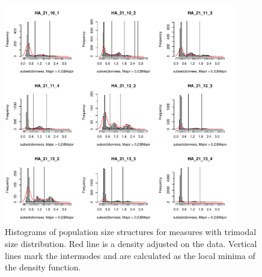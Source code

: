 \begin{figure}[!ht]
   \centering
   \includegraphics[page=3,width=0.9\textwidth]{5_ChapExp3/fig/Hist_trimodaux_supp}
 \caption[Size structure of the trimodal populations]{Histograms of population
size structures for measures with trimodal size distribution. Red line is a density adjusted on the data. Vertical lines
mark the intermodes and are calculated as the local minima of the density
function.}
 \label{Fig5-S2}
\end{figure}

